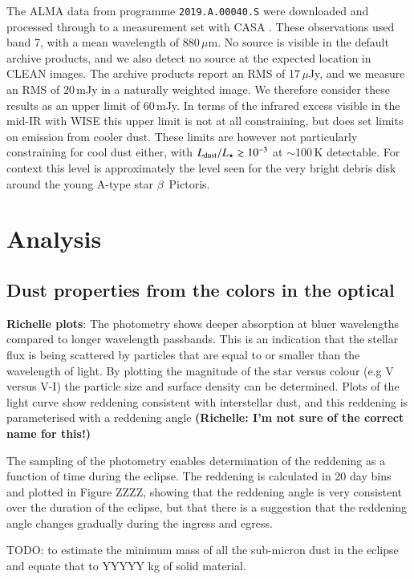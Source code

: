 \documentclass{aa}
\begin{document}
The ALMA data from programme \texttt{2019.A.00040.S} were downloaded and processed through to a measurement set with CASA \citep{2007ASPC..376..127M}. These observations used band 7, with a mean wavelength of 880\,$\mu$m.
%
No source is visible in the default archive products, and we also detect no source at the expected location in CLEAN images.
%
The archive products report an RMS of 17\,$\mu$Jy, and we measure an RMS of $20$\,mJy in a naturally weighted image. We therefore consider these results as an upper limit of $60$\,mJy.
%
In terms of the infrared excess visible in the mid-IR with WISE this upper limit is not at all constraining, but does set limits on emission from cooler dust.
%
These limits are however not particularly constraining for cool dust either, with $L_{\rm dust}/L_\star \gtrsim 10^{-3}$ at $\sim$100\,K detectable. For context this level is approximately the level seen for the very bright debris disk around the young A-type star $\beta$~Pictoris.

\section{Analysis}\label{sec:dustcloud}

\subsection{Dust properties from the colors in the optical}

{\bf Richelle plots}: The photometry shows deeper absorption at bluer wavelengths compared to longer wavelength passbands.
%
This is an indication that the stellar flux is being scattered by particles that are equal to or smaller than the wavelength of light.
%
By plotting the magnitude of the star versus colour (e.g V versus V-I) the particle size and surface density can be determined.
%
Plots of the light curve show reddening consistent with interstellar dust, and this reddening is parameterised with a reddening angle {\bf (Richelle: I'm not sure of the correct name for this!)}

The sampling of the photometry enables determination of the reddening as a function of time during the eclipse.
%
The reddening is calculated in 20 day bins and plotted in Figure ZZZZ, showing that the reddening angle is very consistent over the duration of the eclipse, but that there is a suggestion that the reddening angle changes gradually during the ingress and egress.

TODO: to estimate the minimum mass of all the sub-micron dust in the eclipse and equate that to YYYYY kg of solid material.
\end{document}
